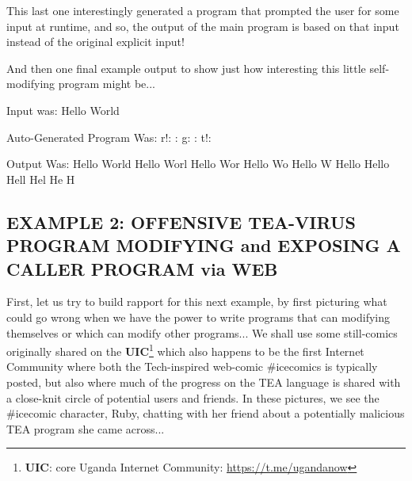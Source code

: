 \documentclass[a4paper, 18pt]{book} %
\begin{document}
This last one interestingly generated a program that prompted the user for some input at runtime, and so, the output of the main program is based on that input instead of the original explicit input!

\vspace{1em}

And then one final example output to show just how interesting this little self-modifying program might be...


  \begin{tcbverbatim}[title=Sample Session of Self-Modifying TEA Hello World]
Input was:
Hello World


Auto-Generated Program Was:
r!: :
g: :
t!:


Output Was:
Hello World
Hello Worl
Hello Wor
Hello Wo
Hello W
Hello 
Hello
Hell
Hel
He
H
  \end{tcbverbatim}



\subsection{EXAMPLE 2: OFFENSIVE TEA-VIRUS PROGRAM MODIFYING and EXPOSING A CALLER PROGRAM via WEB}
\label{SECEXAMP2E}


First, let us try to build rapport for this next example, by first picturing what could go wrong when we have the power to write programs that can modifying themselves or which can modify other programs... We shall use some still-comics originally shared on the \textbf{UIC}\footnote{\textbf{UIC}: core Uganda Internet Community: \url{https://t.me/ugandanow}} which also happens to be the first Internet Community where both the Tech-inspired web-comic \#icecomics is typically posted, but also where much of the progress on the TEA language is shared with a close-knit circle of potential users and friends. In these pictures, we see the \#icecomic character, Ruby, chatting with her friend about a potentially malicious TEA program she came across...
\end{document}
